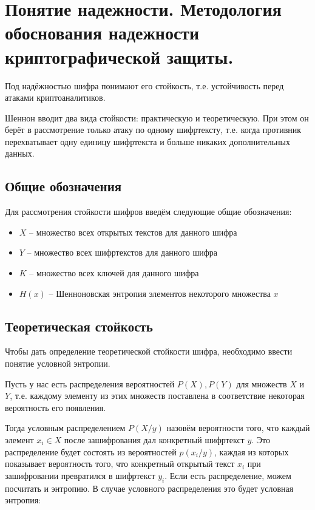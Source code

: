 \section{Понятие надежности. Методология обоснования надежности криптографической защиты.}

Под надёжностью шифра понимают его стойкость, т.е. устойчивость перед атаками криптоаналитиков. 

Шеннон вводит два вида стойкости: практическую и теоретическую. При этом он берёт в рассмотрение только атаку по одному шифртексту, т.е. когда противник перехватывает одну единицу шифртекста и больше никаких дополнительных данных. 

\subsection{Общие обозначения}

Для рассмотрения стойкости шифров введём следующие общие обозначения:

\begin{itemize}
	\item $X$ -- множество всех открытых текстов для данного шифра
	\item $Y$ -- множество всех шифртекстов для данного шифра
	\item $K$ -- множество всех ключей для данного шифра
	\item $H(x)$ -- Шенноновская энтропия элементов некоторого множества $x$
\end{itemize}

\subsection{Теоретическая стойкость}

Чтобы дать определение теоретической стойкости шифра, необходимо ввести понятие условной энтропии.

Пусть у нас есть распределения вероятностей $P(X), P(Y)$ для множеств $X$ и $Y$, т.е. каждому элементу из этих множеств поставлена в соответствие некоторая вероятность его появления.

Тогда условным распределением $P(X/y)$ назовём вероятности того, что каждый элемент $x_i \in X$ после зашифрования дал конкретный шифртекст $y$. Это распределение будет состоять из вероятностей $p(x_i/y)$, каждая из которых показывает вероятность того, что конкретный открытый текст $x_i$ при зашифровании превратился в шифртекст $y_i$. Если есть распределение, можем посчитать и энтропию. В случае условного распределения это будет условная энтропия:

